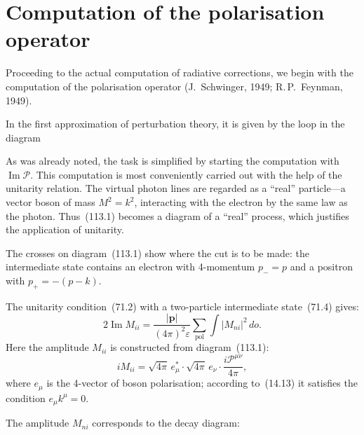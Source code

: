 
\section{Computation of the polarisation operator}


Proceeding to the actual computation of radiative corrections, we begin with the computation of the polarisation operator (J.~Schwinger, 1949; R.\,P.~Feynman, 1949).

In the first approximation of perturbation theory, it is given by the loop in the diagram


As was already noted, the task is simplified by starting the computation with $\operatorname{Im}\mathcal{P}$. This computation is most conveniently carried out with the help of the unitarity relation. The virtual photon lines are regarded as a ``real'' particle---a vector boson of mass $M^2 = k^2$, interacting with the electron by the same law as the photon. Thus~(113.1) becomes a diagram of a ``real'' process, which justifies the application of unitarity.

The crosses on diagram~(113.1) show where the cut is to be made: the intermediate state contains an electron with 4-momentum $p_- = p$ and a positron with $p_+ = -(p - k)$.

The unitarity condition~(71.2) with a two-particle intermediate state~(71.4) gives:
\begin{equation}
2\operatorname{Im} M_{ii} = \frac{|\mathbf{p}|}{(4\pi)^2 \varepsilon} \sum_{\mathrm{pol}} \int |M_{ni}|^2\,d o.
\label{eq:113.2}
\end{equation}
Here the amplitude $M_{ii}$ is constructed from diagram~(113.1):
\begin{equation}
iM_{ii} = \sqrt{4\pi}\,e^*_\mu \cdot \sqrt{4\pi}\,e_\nu \cdot \frac{i\mathcal{P}^{\mu\nu}}{4\pi},
\label{eq:113.3}
\end{equation}
where $e_\mu$ is the 4-vector of boson polarisation; according to~(14.13) it satisfies the condition $e_\mu k^\mu = 0$.

The amplitude $M_{ni}$ corresponds to the decay diagram:


